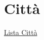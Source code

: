 \section{Città}\label{cittuxe0}

\href{Lista\%20Citta\%CC\%80\%2048bc8ee74c5d40da9f1be03e8a213b3a.csv}{Lista
Città}
